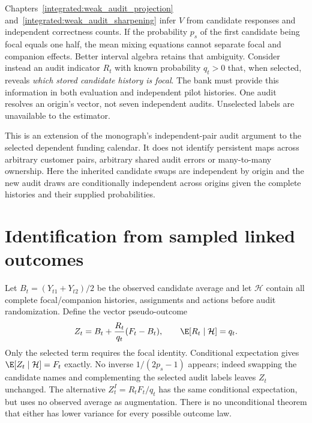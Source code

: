 Chapters~\ref{integrated:weak_audit_projection} and~\ref{integrated:weak_audit_sharpening} infer $V$ from candidate responses and independent correctness counts. If the probability $p_s$ of the first candidate being
focal equals one half, the mean mixing equations cannot separate focal and
companion effects. Better interval algebra retains that ambiguity. Consider
instead an audit indicator $R_t$ with known probability $q_t>0$ that, when
selected, reveals \emph{which stored candidate history is focal}. The bank
must provide this information in both evaluation and independent pilot
histories. One audit resolves an origin's vector, not seven independent
audits. Unselected labels are unavailable to the estimator.

This is an extension of the monograph's independent-pair audit argument to
the selected dependent funding calendar. It does not identify persistent
maps across arbitrary customer pairs, arbitrary shared audit errors or
many-to-many ownership. Here the inherited candidate swaps are independent
by origin and the new audit draws are conditionally independent across
origins given the complete histories and their supplied probabilities.

\section{Identification from sampled linked outcomes}

Let $B_t=(Y_{t1}+Y_{t2})/2$ be the observed candidate average and let
$\mathcal H$ contain all complete focal/companion histories, assignments and
actions before audit randomization. Define the vector pseudo-outcome
\begin{equation}
 Z_t=B_t+\frac{R_t}{q_t}(F_t-B_t),\qquad
 \E[R_t\mid\mathcal H]=q_t.\label{integrated:linked_funding:eq:pseudo}
\end{equation}
Only the selected term requires the focal identity. Conditional expectation
gives $\E[Z_t\mid\mathcal H]=F_t$ exactly. No inverse $1/(2p_s-1)$ appears;
indeed swapping the candidate names and complementing the selected audit
labels leaves $Z_t$ unchanged. The alternative $Z_t^{I}=R_tF_t/q_t$ has the
same conditional expectation, but uses no observed average as augmentation.
There is no unconditional theorem that either has lower variance for every
possible outcome law.

